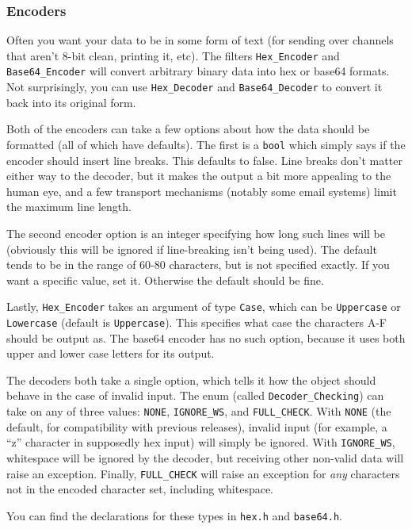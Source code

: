 \documentclass{article}
\newcommand{\filename}[1]{\texttt{#1}}
\newcommand{\type}[1]{\texttt{#1}}
\begin{document}
\subsubsection{Encoders}

Often you want your data to be in some form of text (for sending over channels
that aren't 8-bit clean, printing it, etc). The filters \type{Hex\_Encoder}
and \type{Base64\_Encoder} will convert arbitrary binary data into hex or
base64 formats. Not surprisingly, you can use \type{Hex\_Decoder} and
\type{Base64\_Decoder} to convert it back into its original form.

Both of the encoders can take a few options about how the data should be
formatted (all of which have defaults). The first is a \type{bool} which simply
says if the encoder should insert line breaks. This defaults to
false. Line breaks don't matter either way to the decoder, but it makes the
output a bit more appealing to the human eye, and a few transport mechanisms
(notably some email systems) limit the maximum line length.

The second encoder option is an integer specifying how long such lines will be
(obviously this will be ignored if line-breaking isn't being used). The default
tends to be in the range of 60-80 characters, but is not specified exactly. If
you want a specific value, set it. Otherwise the default should be fine.

Lastly, \type{Hex\_Encoder} takes an argument of type \type{Case}, which can be
\type{Uppercase} or \type{Lowercase} (default is \type{Uppercase}). This
specifies what case the characters A-F should be output as. The base64 encoder
has no such option, because it uses both upper and lower case letters for its
output.

The decoders both take a single option, which tells it how the object should
behave in the case of invalid input. The enum (called \type{Decoder\_Checking})
can take on any of three values: \type{NONE}, \type{IGNORE\_WS}, and
\type{FULL\_CHECK}. With \type{NONE} (the default, for compatibility with
previous releases), invalid input (for example, a ``z'' character in supposedly
hex input) will simply be ignored. With \type{IGNORE\_WS}, whitespace will be
ignored by the decoder, but receiving other non-valid data will raise an
exception. Finally, \type{FULL\_CHECK} will raise an exception for \emph{any}
characters not in the encoded character set, including whitespace.

You can find the declarations for these types in \filename{hex.h} and
\filename{base64.h}.
\end{document}

